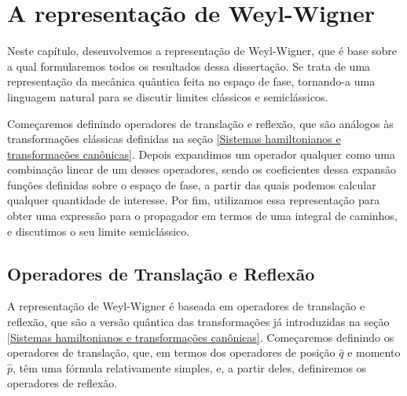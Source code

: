 \documentclass[
	12pt,
	oneside,			%
	a4paper,			%
	english,			%
	brazil				%
	]{abntex2}
\theoremstyle{definition}
\begin{document}
\chapter{A representação de Weyl-Wigner}
\label{A representação de Weyl-Wigner}

Neste capítulo, desenvolvemos a representação de Weyl-Wigner, que é base sobre a qual formularemos todos os resultados dessa dissertação. Se trata de uma representação da mecânica quântica feita no espaço de fase, tornando-a uma linguagem natural para se discutir limites clássicos e semiclássicos.

Começaremos definindo operadores de translação e reflexão, que são análogos às transformações clássicas definidas na seção \ref{Sistemas hamiltonianos e transformações canônicas}. Depois expandimos um operador qualquer como uma combinação linear de um desses operadores, sendo os coeficientes dessa expansão funções definidas sobre o espaço de fase, a partir das quais podemos calcular qualquer quantidade de interesse. Por fim, utilizamos essa representação para obter uma expressão para o propagador em termos de uma integral de caminhos, e discutimos o seu limite semiclássico.

\section{Operadores de Translação e Reflexão}

A representação de Weyl-Wigner é baseada em operadores de translação e reflexão, que são a versão quântica das transformações já introduzidas na seção \ref{Sistemas hamiltonianos e transformações canônicas}. Começaremos definindo os operadores de translação, que, em termos dos operadores de posição $\hat{q}$ e momento $\hat{p}$, têm uma fórmula relativamente simples, e, a partir deles, definiremos os operadores de reflexão. 
\end{document}
